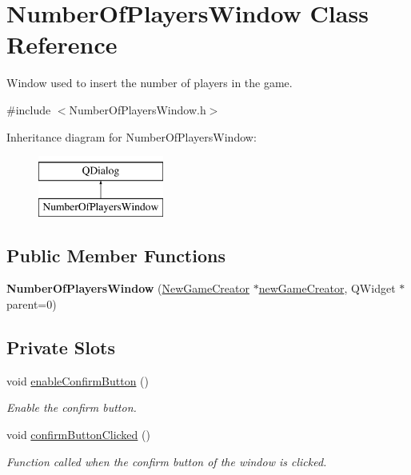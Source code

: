 \hypertarget{classNumberOfPlayersWindow}{}\section{Number\+Of\+Players\+Window Class Reference}
\label{classNumberOfPlayersWindow}


Window used to insert the number of players in the game.  




{\ttfamily \#include $<$Number\+Of\+Players\+Window.\+h$>$}

Inheritance diagram for Number\+Of\+Players\+Window\+:\begin{figure}[H]
\begin{center}
\leavevmode
\includegraphics[height=2.000000cm]{classNumberOfPlayersWindow}
\end{center}
\end{figure}
\subsection*{Public Member Functions}
\begin{DoxyCompactItemize}
\item 
\mbox{\label{classNumberOfPlayersWindow_a522ce7de553a78ef1514cc988abb8d38}} 
{\bfseries Number\+Of\+Players\+Window} (\hyperlink{classNewGameCreator}{New\+Game\+Creator} $\ast$\hyperlink{classNumberOfPlayersWindow_a7a4c90e2553e4f401fde3ec81e7e3f56}{new\+Game\+Creator}, Q\+Widget $\ast$parent=0)
\end{DoxyCompactItemize}
\subsection*{Private Slots}
\begin{DoxyCompactItemize}
\item 
void \hyperlink{classNumberOfPlayersWindow_a7fe10b716af29b5cca42267a391587ec}{enable\+Confirm\+Button} ()
\begin{DoxyCompactList}\small\item\em Enable the confirm button. \end{DoxyCompactList}\item 
void \hyperlink{classNumberOfPlayersWindow_aaebac1245ca92099446f0cac82304dab}{confirm\+Button\+Clicked} ()
\begin{DoxyCompactList}\small\item\em Function called when the confirm button of the window is clicked. \end{DoxyCompactList}\end{DoxyCompactItemize}
